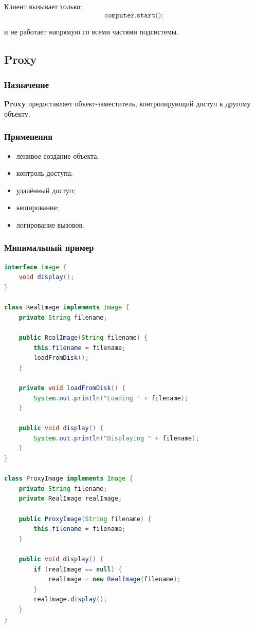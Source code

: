 \documentclass[12pt,a4paper]{article}
\begin{document}
Клиент вызывает только:
\[
\texttt{computer.start();}
\]

и не работает напрямую со всеми частями подсистемы.

\subsection{Proxy}

\subsubsection{Назначение}

\textbf{Proxy} предоставляет объект-заместитель, контролирующий доступ к другому объекту.

\subsubsection{Применения}

\begin{itemize}
    \item ленивое создание объекта;
    \item контроль доступа;
    \item удалённый доступ;
    \item кеширование;
    \item логирование вызовов.
\end{itemize}

\subsubsection{Минимальный пример}

\begin{lstlisting}[language=Java,caption={Proxy}]
interface Image {
    void display();
}

class RealImage implements Image {
    private String filename;

    public RealImage(String filename) {
        this.filename = filename;
        loadFromDisk();
    }

    private void loadFromDisk() {
        System.out.println("Loading " + filename);
    }

    public void display() {
        System.out.println("Displaying " + filename);
    }
}

class ProxyImage implements Image {
    private String filename;
    private RealImage realImage;

    public ProxyImage(String filename) {
        this.filename = filename;
    }

    public void display() {
        if (realImage == null) {
            realImage = new RealImage(filename);
        }
        realImage.display();
    }
}
\end{lstlisting}
\end{document}

